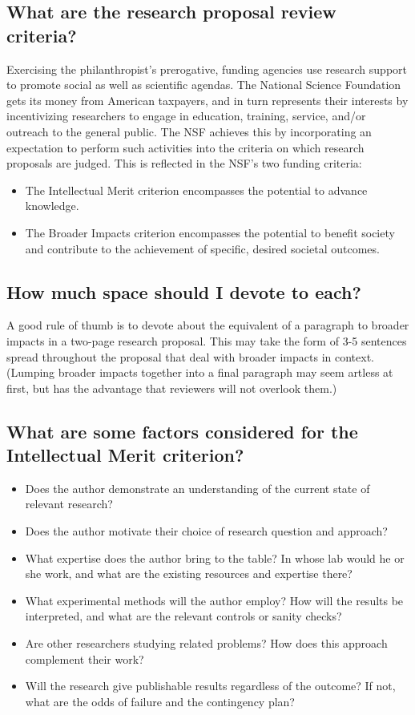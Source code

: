 \documentclass{article}
\begin{document}
\subsection*{What are the research proposal review criteria?}

Exercising the philanthropist's prerogative, funding agencies use research support to promote social as well as scientific agendas. The National Science Foundation gets its money from American taxpayers, and in turn represents their interests by incentivizing researchers to engage in education, training, service, and/or outreach to the general public. The NSF achieves this by incorporating an expectation to perform such activities into the criteria on which research proposals are judged. This is reflected in the NSF's two funding criteria:

\begin{itemize}
\item The Intellectual Merit criterion encompasses the potential to advance knowledge.
\item The Broader Impacts criterion encompasses the potential to benefit society and contribute to the achievement of specific, desired societal outcomes.
\end{itemize}

\subsection*{How much space should I devote to each?}

A good rule of thumb is to devote about the equivalent of a paragraph to broader impacts in a two-page research proposal. This may take the form of 3-5 sentences spread throughout the proposal that deal with broader impacts in context. (Lumping broader impacts together into a final paragraph may seem artless at first, but has the advantage that reviewers will not overlook them.)

\subsection*{What are some factors considered for the Intellectual Merit criterion?}

\begin{itemize}
\item Does the author demonstrate an understanding of the current state of relevant research?
\item Does the author motivate their choice of research question and approach?
\item What expertise does the author bring to the table? In whose lab would he or she work, and what are the existing resources and expertise there?
\item What experimental methods will the author employ? How will the results be interpreted, and what are the relevant controls or sanity checks?
\item Are other researchers studying related problems? How does this approach complement their work?
\item Will the research give publishable results regardless of the outcome? If not, what are the odds of failure and the contingency plan?
\end{itemize}
\end{document}
